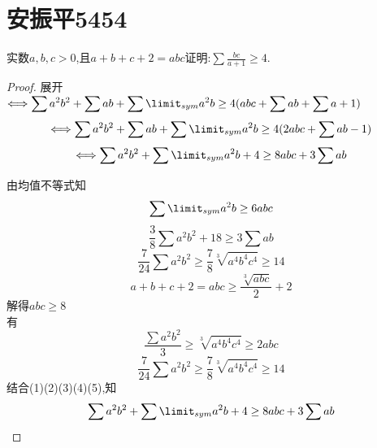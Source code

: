 \documentclass[]{article}
\title{}
\author{}
\date{}
\begin{document}
\maketitle
\section{安振平5454}{
实数$\displaystyle a,b,c>0$,且$\displaystyle a+b+c+2=abc$证明:$ \displaystyle \sum \frac{bc}{a+1}\geq 4$.

\begin{proof}{}
展开$\displaystyle \Longleftrightarrow \sum a^2b^2+\sum ab+\sum\limit_{sym}a^2b\geq 4(abc+\sum ab+\sum a+1) $\\
\begin{equation}
\Longleftrightarrow \sum a^2b^2+\sum ab+\sum\limit_{sym}a^2b\geq 4(2abc+\sum ab-1)
\end{equation}
\begin{equation}\nonumber
\Longleftrightarrow \sum a^2b^2+\sum\limit_{sym}a^2b+4\geq 8abc+3\sum ab
\end{equation}

由均值不等式知\begin{equation}
\sum\limit_{sym}a^2b\geq 6abc
\end{equation}
\begin{equation}
\frac{3}{8}\sum a^2b^2+18\geq 3\sum ab
\end{equation}
\begin{equation}
\frac{7}{24}\sum a^2b^2\geq \frac{7}{8}\sqrt[3]{a^4b^4c^4}\geq 14
\end{equation}
\begin{equation}\nonumber
a+b+c+2=abc\geq\frac{\sqrt[3]{abc}}{2}+2
\end{equation}
解得$abc\geq 8$\\
有
\begin{equation}
\frac{\sum a^2b^2}{3}\geq \sqrt[3]{a^4b^4c^4}\geq 2abc
\end{equation}
\begin{equation}
\frac{7}{24}\sum a^2b^2\geq \frac{7}{8}\sqrt[3]{a^4b^4c^4}\geq 14
\end{equation}
结合(1)(2)(3)(4)(5),知
\begin{equation}\nonumber
\sum a^2b^2+\sum\limit_{sym}a^2b+4\geq 8abc+3\sum ab
\end{equation}
\end{proof}
}
\end{document}
